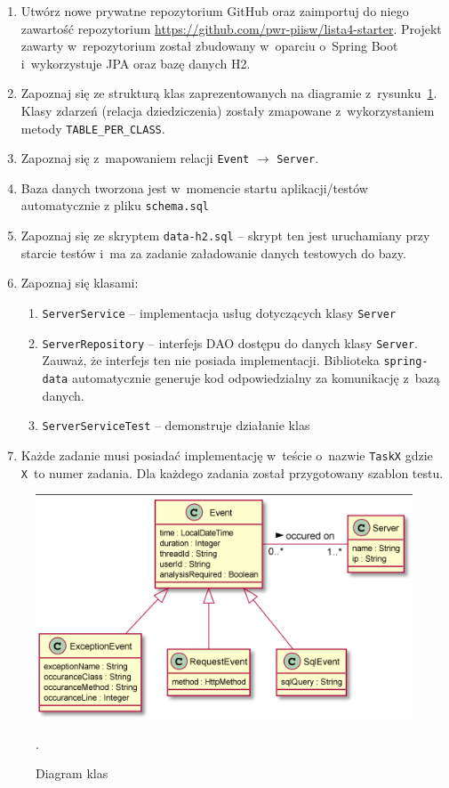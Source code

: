 \documentclass[12pt]{article}
\begin{document}
        \begin{enumerate}
            \item Utwórz nowe prywatne repozytorium GitHub oraz zaimportuj do niego zawartość repozytorium \url{https://github.com/pwr-piisw/lista4-starter}. Projekt zawarty w~repozytorium został zbudowany w~oparciu o~Spring Boot i~wykorzystuje JPA oraz bazę danych H2.
            \item Zapoznaj się ze strukturą klas zaprezentowanych na diagramie z~rysunku~\ref{fig:class-diagram}. Klasy zdarzeń (relacja dziedziczenia) zostały zmapowane z~wykorzystaniem metody \texttt{TABLE\_PER\_CLASS}.
            \item Zapoznaj się z~mapowaniem relacji \texttt{Event} $\rightarrow$ \texttt{Server}.
            \item Baza danych tworzona jest w~momencie startu aplikacji/testów automatycznie z pliku \texttt{schema.sql}
            \item Zapoznaj się ze skryptem \texttt{data-h2.sql} -- skrypt ten jest uruchamiany przy starcie testów i~ma za zadanie załadowanie danych testowych do bazy.
            \item Zapoznaj się klasami:
                \begin{enumerate}
                    \item \texttt{ServerService} – implementacja usług dotyczących klasy \texttt{Server}
                    \item \texttt{ServerRepository} – interfejs DAO dostępu do danych klasy \texttt{Server}. Zauważ, że interfejs ten nie posiada implementacji. Biblioteka \texttt{spring-data} automatycznie generuje kod odpowiedzialny za komunikację z~bazą danych.
                    \item \texttt{ServerServiceTest} – demonstruje działanie klas
                \end{enumerate}
            \item Każde zadanie musi posiadać implementację w~teście o~nazwie \texttt{TaskX} gdzie \texttt{X}~to numer zadania. Dla każdego zadania został przygotowany szablon testu.
        \end{enumerate}
        \begin{figure}[ht]
            \centering
            \includegraphics{lista4_class_diagram_1.png}
            \caption{Diagram klas}.
            \label{fig:class-diagram}
        \end{figure}
\end{document}
